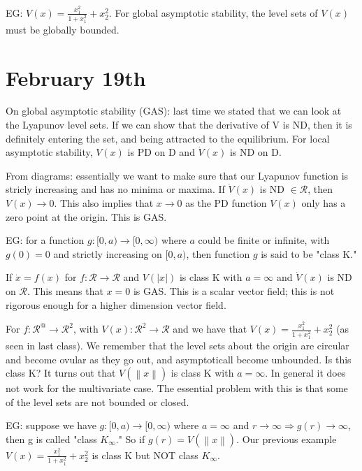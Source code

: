 \documentclass[11pt]{article}
\newcommand{\norm}[1]{\left\lVert#1\right\rVert}
\begin{document}
EG: $V(x) = \frac{x_1^2}{1+x_1^2}+x_2^2$. For global asymptotic stability, the level sets of $V(x)$ must be globally bounded.





\section*{February 19th}
On global asymptotic stability (GAS): last time we stated that we can look at the Lyapunov level sets. If we can show that the derivative of V is ND, then it is definitely entering the set, and being attracted to the equilibrium. For local asymptotic stability, $V(x)$ is PD on D and $\dot{V}(x)$ is ND on D.

From  diagrams: essentially we want to make sure that our Lyapunov function is stricly increasing and has no minima or maxima. If $\dot{V}(x)$ is ND $\in \mathcal{R}$, then $V(x) \rightarrow 0$. This also implies that $x\rightarrow 0$ as the PD function $V(x)$ only has a zero point at the origin. This is GAS.

EG: for a function $g:[0,a)\rightarrow [0,\infty)$ where $a$ could be finite or infinite, with $g(0) = 0$ and strictly increasing on $[0,a)$, then function $g$ is said to be "class K." 

If $\dot{x} = f(x)$ for $f:\mathcal{R} \rightarrow \mathcal{R}$ and $V(\rvert x \rvert)$ is class K with $a = \infty$ and $\dot{V}(x)$ is ND on $\mathcal{R}$. This means that $x=0$ is GAS. This is a scalar vector field; this is not rigorous enough for a higher dimension vector field.

For $f:\mathcal{R}^@ \rightarrow \mathcal{R}^2$, with $V(x): \mathcal{R}^2 \rightarrow \mathcal{R}$ and we have that $V(x) = \frac{x_1^2}{1+x_1^2} + x_2^2$ (as seen in last class). We remember that the level sets about the origin are circular and become ovular as they go out, and asymptoticall become unbounded. Is this class K? It turns out that $V(\norm{x})$ is class K with $a = \infty$. In general it does not work for the multivariate case. The essential problem with this is that some of the level sets are not bounded or closed.

EG: suppose we have $g:[0,a)\rightarrow [0,\infty)$ where $a=\infty$ and $r \rightarrow \infty \Rightarrow g(r) \rightarrow \infty$, then g is called "class $K_\infty$." So if $g(r) = V(\norm{x})$. Our previous example $V(x) = \frac{x_1^2}{1+x_1^2} + x_2^2$ is class K but NOT class $K_\infty$.
\end{document}
